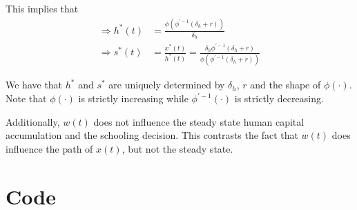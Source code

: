 \documentclass[12pt]{article}
\newcommand{\1}{{\bf 1}} %
\begin{document}
\begin{enumerate}[(1)]
This implies that
\begin{align*}
	\Rightarrow h^*(t) &  = \frac{\phi(\phi^{'-1}(\delta_h+r))}{\delta_h}\\
\Rightarrow  s^*(t) & =  \frac{x^*(t)}{ h^*(t)} = \frac{\delta_h\phi^{'-1}(\delta_h+r)}{\phi(\phi^{'-1}(\delta_h+r))}
\end{align*}

We have that $h^*$ and $s^*$ are uniquely determined by $\delta_h$, $r$ and the shape of $\phi(\cdot)$. Note that $\phi(\cdot)$ is strictly increasing while $\phi^{'-1}(\cdot)$ is strictly decreasing. 

Additionally, $w(t)$ does not influence the steady state human capital accumulation and the schooling decision. This contrasts the fact that $w(t)$ does influence the path of $x(t)$, but not the steady state.

\end{enumerate}
	
	
\section*{Code}


\end{document}
